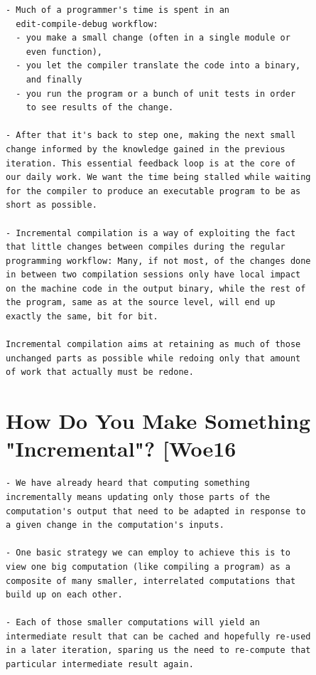 \documentclass[12pt, a4paper]{report}
\begin{document}
\begin{verbatim}
- Much of a programmer's time is spent in an
  edit-compile-debug workflow:
  - you make a small change (often in a single module or
    even function),
  - you let the compiler translate the code into a binary,
    and finally
  - you run the program or a bunch of unit tests in order
    to see results of the change.

- After that it's back to step one, making the next small
change informed by the knowledge gained in the previous
iteration. This essential feedback loop is at the core of
our daily work. We want the time being stalled while waiting
for the compiler to produce an executable program to be as
short as possible.

- Incremental compilation is a way of exploiting the fact
that little changes between compiles during the regular
programming workflow: Many, if not most, of the changes done
in between two compilation sessions only have local impact
on the machine code in the output binary, while the rest of
the program, same as at the source level, will end up
exactly the same, bit for bit.

Incremental compilation aims at retaining as much of those
unchanged parts as possible while redoing only that amount
of work that actually must be redone.
\end{verbatim}
\cite{rust_blog_incremental_compilation}

\section*{How Do You Make Something "Incremental"? [Woe16}

\begin{verbatim}
- We have already heard that computing something
incrementally means updating only those parts of the
computation's output that need to be adapted in response to
a given change in the computation's inputs.

- One basic strategy we can employ to achieve this is to
view one big computation (like compiling a program) as a
composite of many smaller, interrelated computations that
build up on each other.

- Each of those smaller computations will yield an
intermediate result that can be cached and hopefully re-used
in a later iteration, sparing us the need to re-compute that
particular intermediate result again.
\end{verbatim}
\cite{rust_blog_incremental_compilation}
\end{document}
